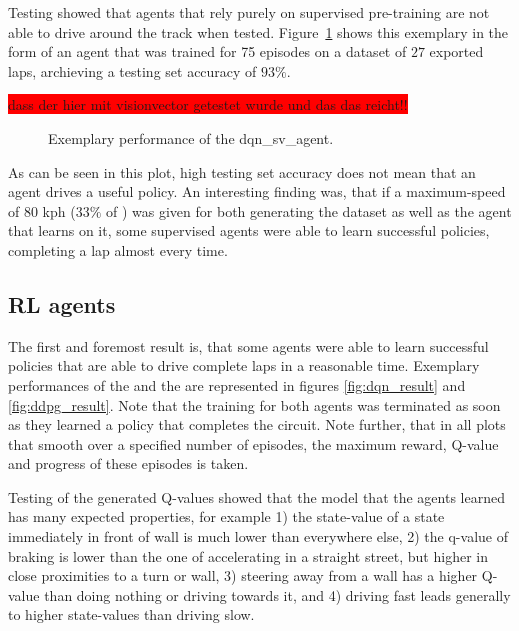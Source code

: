 Testing showed that agents that rely purely on supervised pre-training are not able to drive around the track when tested. Figure~\ref{fig:sv_result} shows this exemplary in the form of an agent that was trained for 75 episodes on a dataset of $27$ exported laps, archieving a testing set accuracy of $93\%$.

\colorbox{red}{dass der hier mit visionvector getestet wurde und das das reicht!!}

\begin{figure}[h]
	{%
		\setlength{\fboxsep}{0pt}%
		\setlength{\fboxrule}{1pt}%
	}%
	\centering
	\caption[Exemplary performance of the dqn\_sv\_agent]{Exemplary performance of the dqn\_sv\_agent.}
	\label{fig:sv_result}
\end{figure}

As can be seen in this plot, high testing set accuracy does not mean that an agent drives a useful policy. An interesting finding was, that if a maximum-speed of $80$ kph ($33\%$ of ) was given for both generating the dataset as well as the agent that learns on it, some supervised agents were able to learn successful policies, completing a lap almost every time.

\subsection{RL agents}

The first and foremost result is, that some agents were able to learn successful policies that are able to drive complete laps in a reasonable time. Exemplary performances of the  and the  are represented in figures \ref{fig:dqn_result} and \ref{fig:ddpg_result}. Note that the training for both agents was terminated as soon as they learned a policy that completes the circuit. Note further, that in all plots that smooth over a specified number of episodes, the maximum reward, Q-value and progress of these episodes is taken.

Testing of the generated Q-values showed that the model that the agents learned has many expected properties, for example 1) the state-value of a state immediately in front of wall is much lower than everywhere else, 2) the q-value of braking is lower than the one of accelerating in a straight street, but higher in close proximities to a turn or wall, 3) steering away from a wall has a higher Q-value than doing nothing or driving towards it, and 4) driving fast leads generally to higher state-values than driving slow. 

